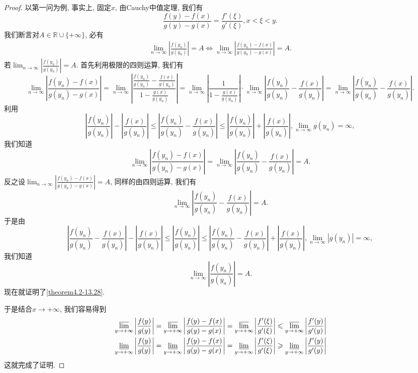 \documentclass[../../main.tex]{subfiles}
\begin{document}
\begin{proof}
以第一问为例, 事实上, 固定\(x\), 由Cauchy中值定理, 我们有
\[
\frac{f(y)-f(x)}{g(y)-g(x)}=\frac{f'(\xi)}{g'(\xi)},x < \xi < y.
\]
我们断言对\(A \in \mathbb{R} \cup \{+\infty\}\), 必有
\begin{align}\label{theorem4.2-13.28}
\lim_{n\rightarrow\infty}\left|\frac{f(y_n)}{g(y_n)}\right| = A \Leftrightarrow \lim_{n\rightarrow\infty}\left|\frac{f(y_n)-f(x)}{g(y_n)-g(x)}\right| = A.
\end{align}
若\(\lim_{n\rightarrow\infty}\left|\frac{f(y_n)}{g(y_n)}\right| = A\). 首先利用极限的四则运算, 我们有
\[
\lim_{n\rightarrow\infty}\left|\frac{f(y_n)-f(x)}{g(y_n)-g(x)}\right|=\lim_{n\rightarrow\infty}\left|\frac{\frac{f(y_n)}{g(y_n)}-\frac{f(x)}{g(y_n)}}{1 - \frac{g(x)}{g(y_n)}}\right|=\lim_{n\rightarrow\infty}\left|\frac{1}{1 - \frac{g(x)}{g(y_n)}}\right|\cdot\lim_{n\rightarrow\infty}\left|\frac{f(y_n)}{g(y_n)}-\frac{f(x)}{g(y_n)}\right|=\lim_{n\rightarrow\infty}\left|\frac{f(y_n)}{g(y_n)}-\frac{f(x)}{g(y_n)}\right|.
\]
利用
\[
\left|\frac{f(y_n)}{g(y_n)}\right|-\left|\frac{f(x)}{g(y_n)}\right|\leqslant\left|\frac{f(y_n)}{g(y_n)}-\frac{f(x)}{g(y_n)}\right|\leqslant\left|\frac{f(y_n)}{g(y_n)}\right|+\left|\frac{f(x)}{g(y_n)}\right|, \lim_{n\rightarrow\infty} g(y_n) = \infty,
\]
我们知道
\[
\lim_{n\rightarrow\infty}\left|\frac{f(y_n)-f(x)}{g(y_n)-g(x)}\right|=\lim_{n\rightarrow\infty}\left|\frac{f(y_n)}{g(y_n)}-\frac{f(x)}{g(y_n)}\right| = A.
\]
反之设\(\lim_{n\rightarrow\infty}\left|\frac{f(y_n)-f(x)}{g(y_n)-g(x)}\right| = A\), 同样的由四则运算, 我们有
\[
\lim_{n\rightarrow\infty}\left|\frac{f(y_n)}{g(y_n)}-\frac{f(x)}{g(y_n)}\right| = A.
\]
于是由
\[
\left|\frac{f(y_n)}{g(y_n)}-\frac{f(x)}{g(y_n)}\right|-\left|\frac{f(x)}{g(y_n)}\right|\leqslant\left|\frac{f(y_n)}{g(y_n)}\right|\leqslant\left|\frac{f(y_n)}{g(y_n)}-\frac{f(x)}{g(y_n)}\right|+\left|\frac{f(x)}{g(y_n)}\right|, \lim_{n\rightarrow\infty}|g(y_n)| = \infty,
\]
我们知道
\[
\lim_{n\rightarrow\infty}\left|\frac{f(y_n)}{g(y_n)}\right| = A.
\]
现在就证明了\eqref{theorem4.2-13.28}.

于是结合\(x \to +\infty\), 我们容易得到
\begin{align*}
&\varlimsup_{y\rightarrow+\infty}\left|\frac{f(y)}{g(y)}\right|=\varlimsup_{y\rightarrow+\infty}\left|\frac{f(y)-f(x)}{g(y)-g(x)}\right|=\varlimsup_{y\rightarrow+\infty}\left|\frac{f'(\xi)}{g'(\xi)}\right|\leqslant\varlimsup_{y\rightarrow+\infty}\left|\frac{f'(y)}{g'(y)}\right|\\
&\varliminf_{y\rightarrow+\infty}\left|\frac{f(y)}{g(y)}\right|=\varliminf_{y\rightarrow+\infty}\left|\frac{f(y)-f(x)}{g(y)-g(x)}\right|=\varliminf_{y\rightarrow+\infty}\left|\frac{f'(\xi)}{g'(\xi)}\right|\geqslant\varliminf_{y\rightarrow+\infty}\left|\frac{f'(y)}{g'(y)}\right|
\end{align*}
这就完成了证明.
\end{proof}
\end{document}
